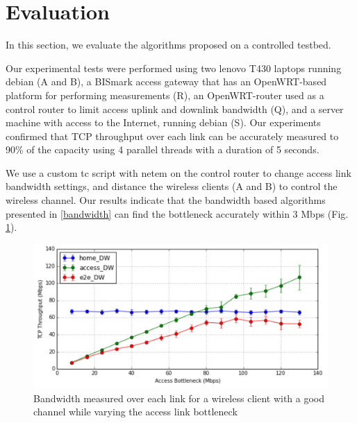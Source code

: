 \section{Evaluation}
\label{evaluation} 
In this section, we evaluate the algorithms proposed on a controlled testbed.

Our experimental tests were performed using two lenovo T430 laptops running debian (A and B), a BISmark access gateway \cite{sundaresan2011broadband} that has an OpenWRT-based platform for performing measurements (R), an OpenWRT-router used as a control router to limit access uplink and downlink bandwidth (Q), and a server machine with access to the Internet, running debian (S). Our experiments confirmed that TCP throughput over each link can be accurately measured to 90\% of the capacity using 4 parallel threads with a duration of 5 seconds.

We use a custom tc script with netem \cite{netem} on the control router to change access link bandwidth settings, and distance the wireless clients (A and B) to control the wireless channel. Our results indicate that the bandwidth based algorithms presented in \ref{bandwidth} can find the bottleneck accurately within 3 Mbps (Fig. \ref{fig:throughput_vs_bottleneck}).

\begin{figure}[!ht]
  \centering
  \includegraphics[width=\linewidth]{figures/tcp_throughput_vs_bottleneck}
  \caption{Bandwidth measured over each link for a wireless client with a good channel while varying the access link bottleneck}
  \label{fig:throughput_vs_bottleneck}
\end{figure}



